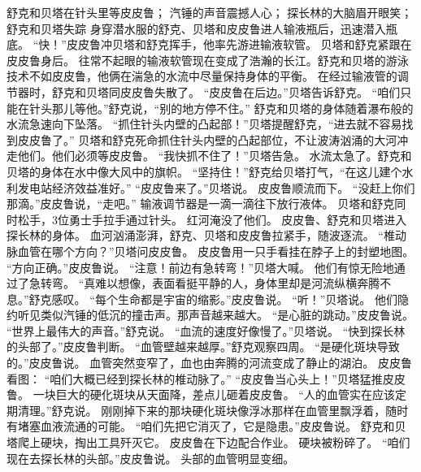 \documentclass[a4paper,12pt,UTF8,twoside]{ctexbook}
\begin{document}
        舒克和贝塔在针头里等皮皮鲁；  
        汽锤的声音震撼人心；  
        探长林的大脑眉开眼笑；  
        舒克和贝塔失踪    
        身穿潜水服的舒克、贝塔和皮皮鲁进人输液瓶后，迅速潜入瓶底。  
        “快！”皮皮鲁冲贝塔和舒克挥手，他率先游进输液软管。  
        贝塔和舒克紧跟在皮皮鲁身后。  
        往常不起眼的输液软管现在变成了浩瀚的长江。舒克和贝塔的游泳技术不如皮皮鲁，他俩在湍急的水流中尽量保持身体的平衡。  
        在经过输液管的调节器时，舒克和贝塔同皮皮鲁失散了。  
        “皮皮鲁在后边。”贝塔告诉舒克。        
        “咱们只能在针头那儿等他。”舒克说，“别的地方停不住。”  
        舒克和贝塔的身体随着瀑布般的水流急速向下坠落。  
        “抓住针头内壁的凸起部！”贝塔提醒舒克，“进去就不容易找到皮皮鲁了。”  
        贝塔和舒克死命抓住针头内壁的凸起部位，不让波涛汹涌的大河冲走他们。他们必须等皮皮鲁。  
        “我快抓不住了！”贝塔告急。  
        水流太急了。舒克和贝塔的身体在水中像大风中的旗帜。  
        “坚持住！”舒克给贝塔打气，“在这儿建个水利发电站经济效益准好。”  
        “皮皮鲁来了。”贝塔说。  
        皮皮鲁顺流而下。  
        “没赶上你们那滴。”皮皮鲁说，“走吧。”  
        输液调节器是一滴一滴往下放行液体。  
        贝塔和舒克同时松手，3位勇士手拉手通过针头。  
        红河淹没了他们。  
        皮皮鲁、舒克和贝塔进入探长林的身体。  
        血河汹涌澎湃，舒克、贝塔和皮皮鲁拉紧手，随波逐流。  
        “椎动脉血管在哪个方向？”贝塔问皮皮鲁。        
        皮皮鲁用一只手看挂在脖子上的封塑地图。  
        “方向正确。”皮皮鲁说。  
        “注意！前边有急转弯！”贝塔大喊。  
        他们有惊无险地通过了急转弯。  
        “真难以想像，表面看挺平静的人，身体里却是河流纵横奔腾不息。”舒克感叹。  
        “每个生命都是宇宙的缩影。”皮皮鲁说。  
        “听！”贝塔说。  
        他们隐约听见类似汽锤的低沉的撞击声。那声音越来越大。  
        “是心脏的跳动。”皮皮鲁说。  
        “世界上最伟大的声音。”舒克说。  
        “血流的速度好像慢了。”贝塔说。  
        “快到探长林的头部了。”皮皮鲁判断。  
        “血管壁越来越厚。”舒克观察四周。  
        “是硬化斑块导致的。”皮皮鲁说。  
        血管突然变窄了，血也由奔腾的河流变成了静止的湖泊。  
        皮皮鲁看图：  
        “咱们大概已经到探长林的椎动脉了。”  
        “皮皮鲁当心头上！”贝塔猛推皮皮鲁。  
        一块巨大的硬化斑块从天面降，差点儿砸着皮皮鲁。  
        “人的血管实在应该定期清理。”舒克说。        
        刚刚掉下来的那块硬化斑块像浮冰那样在血管里飘浮着，随时有堵塞血液流通的可能。  
        “咱们先把它消灭了，它是隐患。”皮皮鲁说。  
        舒克和贝塔爬上硬块，掏出工具歼灭它。  
        皮皮鲁在下边配合作业。  
        硬块被粉碎了。  
        “咱们现在去探长林的头部。”皮皮鲁说。  
        头部的血管明显变细。  
\end{document}
